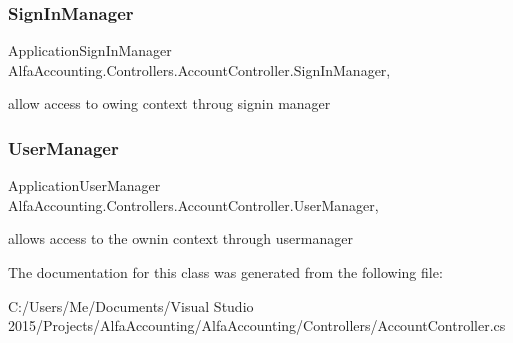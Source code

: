 \subsubsection{\texorpdfstring{Sign\+In\+Manager}{SignInManager}}
{\footnotesize\ttfamily Application\+Sign\+In\+Manager Alfa\+Accounting.\+Controllers.\+Account\+Controller.\+Sign\+In\+Manager\hspace{0.3cm}{\ttfamily [get]}, {}}



allow access to owing context throug signin manager 

\mbox{\label{class_alfa_accounting_1_1_controllers_1_1_account_controller_af407b4124a36361363279ce45a2d8e78}} 
\subsubsection{\texorpdfstring{User\+Manager}{UserManager}}
{\footnotesize\ttfamily Application\+User\+Manager Alfa\+Accounting.\+Controllers.\+Account\+Controller.\+User\+Manager\hspace{0.3cm}{\ttfamily [get]}, {}}



allows access to the ownin context through usermanager 



The documentation for this class was generated from the following file\+:\begin{DoxyCompactItemize}
\item 
C\+:/\+Users/\+Me/\+Documents/\+Visual Studio 2015/\+Projects/\+Alfa\+Accounting/\+Alfa\+Accounting/\+Controllers/Account\+Controller.\+cs\end{DoxyCompactItemize}
